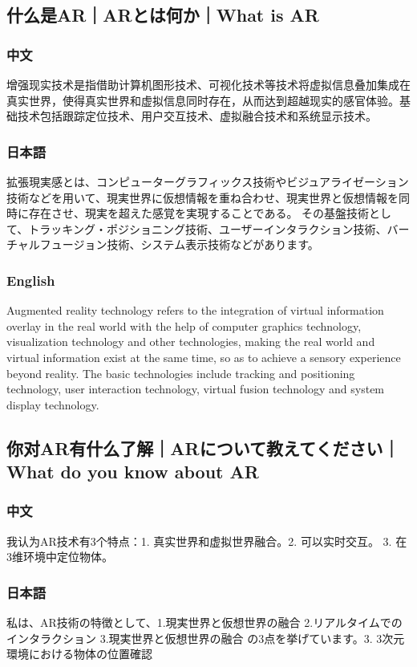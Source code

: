 \documentclass[lang=cn,11pt,a4paper]{elegantpaper}
\begin{document}
\subsection{什么是AR｜ARとは何か｜What is AR}
\subsubsection{中文}
增强现实技术是指借助计算机图形技术、可视化技术等技术将虚拟信息叠加集成在真实世界，使得真实世界和虚拟信息同时存在，从而达到超越现实的感官体验。基础技术包括跟踪定位技术、用户交互技术、虚拟融合技术和系统显示技术。
\subsubsection{日本語}
拡張現実感とは、コンピューターグラフィックス技術やビジュアライゼーション技術などを用いて、現実世界に仮想情報を重ね合わせ、現実世界と仮想情報を同時に存在させ、現実を超えた感覚を実現することである。 その基盤技術として、トラッキング・ポジショニング技術、ユーザーインタラクション技術、バーチャルフュージョン技術、システム表示技術などがあります。
\subsubsection{English}
Augmented reality technology refers to the integration of virtual information overlay in the real world with the help of computer graphics technology, visualization technology and other technologies, making the real world and virtual information exist at the same time, so as to achieve a sensory experience beyond reality. The basic technologies include tracking and positioning technology, user interaction technology, virtual fusion technology and system display technology.

\subsection{你对AR有什么了解｜ARについて教えてください｜What do you know about AR}
\subsubsection{中文}
我认为AR技术有3个特点：1. 真实世界和虚拟世界融合。2. 可以实时交互。 3. 在3维环境中定位物体。
\subsubsection{日本語}
私は、AR技術の特徴として、1.現実世界と仮想世界の融合 2.リアルタイムでのインタラクション 3.現実世界と仮想世界の融合 の3点を挙げています。3. 3次元環境における物体の位置確認
\end{document}
